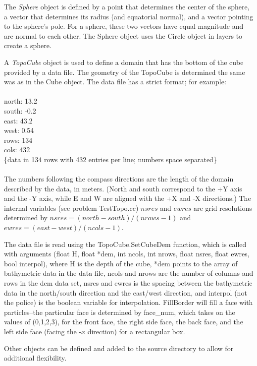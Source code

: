\documentclass[12pt]{memoir}
\begin{document}
The {\em Sphere} object is defined by a point that determines the center
of the sphere, a vector that determines its radius (and equatorial
normal), and a vector pointing to the sphere's pole. For a sphere,
these two vectors have equal magnitude and are normal to each other.
The Sphere object uses the Circle object in layers to create a sphere.

A {\em TopoCube} object is used to define a domain that has the bottom
of the cube provided by a data file. The geometry of the TopoCube is
determined the same was as in the Cube object. The data file has a
strict format; for example: \\\\ north: 13.2 \\ south: -0.2\\ east:
43.2 \\ west: 0.54 \\ rows: 134\\ cols: 432 \\ \{data in 134 rows
with 432 entries per line; numbers space separated\}\\ \\ The numbers
following the compass directions are the length of the domain described
by the data, in meters. (North and south correspond to the +Y axis and
the -Y axis, while E and W are aligned with the +X and -X directions.)
The internal variables (see problem TestTopo.cc) $nsres$ and $ewres$ are
grid resolutions determined by $nsres= (north-south)/(nrows-1)$ and
$ewres= (east -west)/(ncols-1)$.

The data file is read using the TopoCube.SetCubeDem function, which is
called with arguments (float H, float *dem, int ncols, int nrows, float
nsres, float ewres, bool interpol), where H is the depth of the cube,
*dem points to the array of bathymetric data in the data file, ncols and
nrows are the number of columns and rows in the dem data set, nsres and
ewres is the spacing between the bathymetric data in the north/south
direction and the east/west direction, and interpol (not the police) is
the boolean variable for interpolation. FillBorder will fill a face
with particles--the particular face is determined by face\_num, which
takes on the values of (0,1,2,3), for the front face, the right side
face, the back face, and the left side face (facing the -$x$ direction)
for a rectangular box.

Other objects can be defined and added to the source directory to allow
for additional flexibility.
\end{document}
